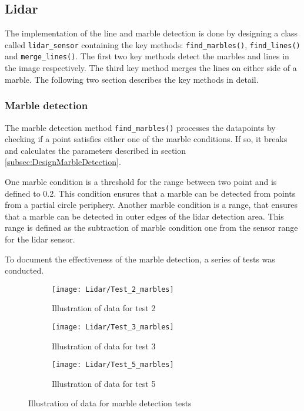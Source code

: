 \documentclass[../Head/Main.tex]{subfiles}
\begin{document}
\subsection{Lidar}
The implementation of the line and marble detection is done by designing a class called \texttt{lidar\_sensor} containing the key methods: \texttt{find\_marbles()}, \texttt{find\_lines()} and \texttt{merge\_lines()}. The first two key methods detect the marbles and lines in the image respectively. The third key method merges the lines on either side of a marble. The following two section describes the key methods in detail.
\subsubsection{Marble detection}
\label{subsubsec:Implementation_marble}
The marble detection method \texttt{find\_marbles()} processes the datapoints by checking if a point satisfies either one of the marble conditions. If so, it breaks and calculates the parameters described in section \ref{subsec:DesignMarbleDetection}.\par 
One marble condition is a threshold for the range between two point and is defined to 0.2. This condition ensures that a marble can be detected from points from a partial circle periphery. Another marble condition is a range, that ensures that a marble can be detected in outer edges of the lidar detection area. This range is defined as the subtraction of marble condition one from the sensor range for the lidar sensor.\par
To document the effectiveness of the marble detection, a series of tests was conducted.
\begin{figure}[H]
  \begin{subfigure}[b]{0.3\textwidth}
  	\centering
    \texttt{[image: Lidar/Test\_2\_marbles]}
    \caption{Illustration of data for test 2}
    \label{fig:MarbleTest2}
  \end{subfigure}
  \hfill
  \begin{subfigure}[b]{0.3\textwidth}
  	\centering
    \texttt{[image: Lidar/Test\_3\_marbles]}
    \caption{Illustration of data for test 3}
    \label{fig:MarbleTest3}
  \end{subfigure}
  \hfill
  \begin{subfigure}[b]{0.3\textwidth}
    \centering
    \texttt{[image: Lidar/Test\_5\_marbles]}
    \caption{Illustration of data for test 5}
    \label{fig:MarbleTest5}
  \end{subfigure}
  \caption{Illustration of data for marble detection tests}
\end{figure}
\end{document}

